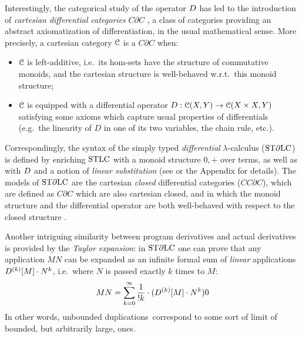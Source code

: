 Interestingly, the categorical study of the operator $\Der$ has led to the introduction of \emph{cartesian differential categories} $C\partial C$ \cite{Blute2009}, a class of categories providing an abstract axiomatization of differentiation, in the usual mathematical sense. More precisely, a cartesian category $\mathcal{C}$ is a $C\partial C$ when:
\begin{itemize}
\item $\mathcal{C}$ is left-additive, i.e.~its hom-sets have the structure of commutative monoids, and the cartesian structure is well-behaved w.r.t.~this monoid structure;
\item $\mathcal{C}$ is equipped with a differential operator $D:
\mathcal{C}(X,Y)\to \mathcal{C}(X\times X,Y)$ satisfying some axioms which capture usual properties of differentials (e.g.~the linearity of $D$ in one of its two variables, the chain rule, etc.).
\end{itemize}

Correspondingly, the syntax of the simply typed \emph{differential} $\lambda$-calculus ($\mathrm{ST}\partial\mathrm{LC}$) is defined by enriching $\mathrm{STLC}$ with a monoid structure $0,+$ over terms, as well as with $\Der$ and a notion of \emph{linear substitution} (see \cite{difflambda} or the Appendix for details).
The models of $\mathrm{ST}\partial\mathrm{LC}$ are the 
cartesian \emph{closed} differential categories ($CC\partial C$), 
which are defined as $C\partial C$ which are also cartesian closed, and in which the monoid structure and the differential operator are both well-behaved with respect to the closed structure \cite{Manzo2012}. 


Another intriguing similarity between program derivatives and 
actual derivatives is provided by the \emph{Taylor expansion}:
in $\mathrm{ST}\partial\mathrm{LC}$ one can prove that any application $MN$ can be expanded as an infinite formal sum of \emph{linear} applications
$\Der^{(k)}[M]\cdot N^{k}$, i.e.~where $N$ is passed exactly $k$ times to $M$:
\begin{align}\label{eq:taylor}
MN  =  \sum_{k=0}^{\infty}\frac{1}{!k}\cdot (\Der^{(k)}[M] \cdot N^{k})0
\end{align}
In other words, unbounded duplications correspond to some sort of limit of bounded, but arbitrarily large, ones.%

